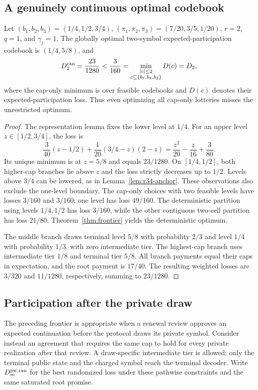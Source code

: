 \subsection{A genuinely continuous optimal codebook}
\begin{proposition}\label{prop:r34-offcap}
Let $(b_1,b_2,b_3)=(1/4,1/2,3/4)$, $(\pi_1,\pi_2,\pi_3)=(7/20,3/5,1/20)$, $r=2$, $q=1$, and $\gamma_j=1$. The globally optimal two-symbol expected-participation codebook is $(1/4,5/8)$, and
\begin{equation}\label{eq:r34-offcap}
 D_2^{\rm ran}=\frac{23}{1280}
 <\frac{3}{160}
 =\min_{\substack{|c|\leq2\\c\subseteq\{b_1,b_2,b_3\}}}D(c)
 =D_2,
\end{equation}
where the cap-only minimum is over feasible codebooks and $D(c)$ denotes their expected-participation loss. Thus even optimizing all cap-only lotteries misses the unrestricted optimum.
\end{proposition}
\begin{proof}
The representation lemma fixes the lower level at $1/4$. For an upper level $z\in[1/2,3/4]$, the loss is
\[
 \frac{3}{40}(z-1/2)+\frac1{20}(3/4-z)(2-z)
 =\frac{z^2}{20}-\frac{z}{16}+\frac{3}{80}.
\]
Its unique minimum is at $z=5/8$ and equals $23/1280$. On $[1/4,1/2]$, both higher-cap branches lie above $z$ and the loss strictly decreases up to $1/2$. Levels above $3/4$ can be lowered, as in Lemma~\ref{lem:r34-anchor}. These observations also exclude the one-level boundary. The cap-only choices with two feasible levels have losses $3/160$ and $3/160$; one level has loss $49/160$. The deterministic partition using levels $1/4,1/2$ has loss $3/160$, while the other contiguous two-cell partition has loss $21/80$. Theorem~\ref{thm:frontier} yields the deterministic optimum.

The middle branch draws terminal level $5/8$ with probability $2/3$ and level $1/4$ with probability $1/3$, with zero intermediate tier. The highest-cap branch uses intermediate tier $1/8$ and terminal tier $5/8$. All branch payments equal their caps in expectation, and the root payment is $17/40$. The resulting weighted losses are $3/320$ and $11/1280$, respectively, summing to $23/1280$.\end{proof}

\subsection{Participation after the private draw}
The preceding frontier is appropriate when a renewal review approves an expected continuation before the protocol draws its private symbol. Consider instead an agreement that requires the same cap to hold for every private realization after that review. A draw-specific intermediate tier is allowed; only the terminal public state and the charged symbol reach the terminal decoder. Write $D_m^{\rm pw,ran}$ for the best randomized loss under these pathwise constraints and the same saturated root promise.

